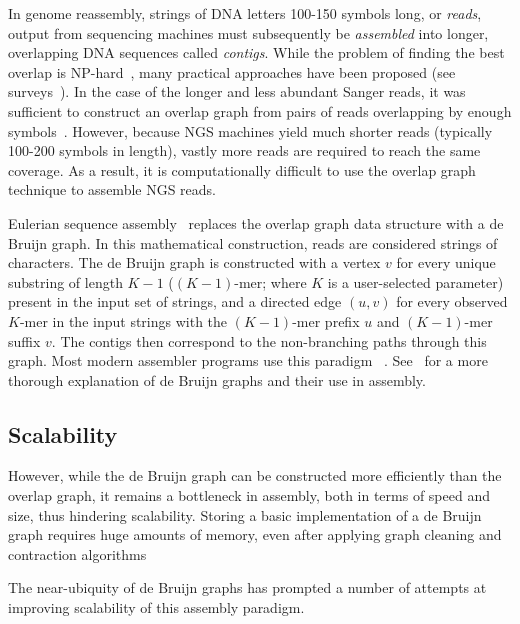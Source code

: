 In genome reassembly, strings of DNA letters 100-150 symbols long, or {\em reads}, output from sequencing machines must subsequently be
{\em assembled} into longer, overlapping DNA sequences called {\em contigs}.
While the problem of finding the best overlap is NP-hard~\cite{Mye95}, many practical approaches
have been proposed (see surveys~\cite{KasMor06,MilKor10,Pop09}).
In the case of the longer and less abundant Sanger reads, it was sufficient to construct an
overlap graph from pairs of reads overlapping by enough symbols~\cite{BatJaf02,HuaYan05,MyeSut00}.
However, because NGS machines yield much shorter reads (typically 100-200 symbols in length),
vastly more reads are required to reach the same coverage. As a result, it is computationally difficult to use the overlap graph technique to assemble NGS reads.

Eulerian sequence assembly~\cite{IW95,PTW} replaces the overlap graph data structure with a de Bruijn graph. In this mathematical construction, reads are considered strings of characters. The de Bruijn graph is constructed with a vertex
$v$ for every unique substring of length $K-1$ ($(K-1)$-mer; where $K$ is a user-selected parameter)  present in the input set of strings,
and a directed edge $(u, v)$ for every observed $K$-mer in the input strings with the $(K-1)$-mer prefix $u$ and $(K-1)$-mer
suffix $v$. The contigs then correspond to the non-branching paths through this graph. Most modern
assembler programs use this paradigm~%
		\cite{bankevich2012spades,peng2010idba,Li:2010,Simpson:2009,Butler:2008,ZerBir08,SahShi12,MacPrz09}. 
See~%
\cite{Compeau11}
for a more thorough explanation of de Bruijn graphs and their use in assembly.

\subsection{Scalability}
However, while the de Bruijn graph can be constructed more efficiently than the overlap graph, it remains a bottleneck in assembly, both in terms of speed and size, thus hindering scalability.
Storing a basic implementation of a de Bruijn graph requires huge amounts of memory, even after applying graph
cleaning and contraction algorithms~\cite{ZerBir08}%

The near-ubiquity of de Bruijn graphs has prompted a number of attempts at
improving scalability of this assembly paradigm.

